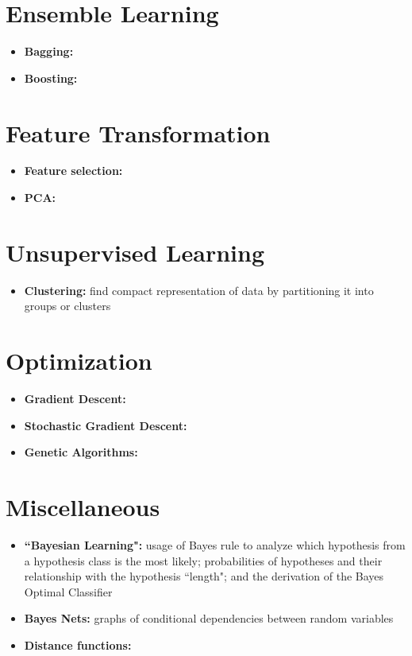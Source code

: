 \documentclass[12pt]{article}
\begin{document}
\section{Ensemble Learning}

\begin{itemize}
	\item \textbf{Bagging:}
	\item \textbf{Boosting:}
\end{itemize}

\section{Feature Transformation}

\begin{itemize}
	\item \textbf{Feature selection:}
	\item \textbf{PCA:}
\end{itemize}

\section{Unsupervised Learning}

\begin{itemize}
	\item \textbf{Clustering:} find compact representation of data by partitioning it into groups or clusters
\end{itemize}

\section{Optimization}

\begin{itemize}
	\item \textbf{Gradient Descent:}
	\item \textbf{Stochastic Gradient Descent:}
	\item \textbf{Genetic Algorithms:}
\end{itemize}

\section{Miscellaneous}

\begin{itemize}
	\item \textbf{``Bayesian Learning"\emph{}:} usage of Bayes rule to analyze which hypothesis from a hypothesis class is the most likely; probabilities of hypotheses and their relationship with the hypothesis ``length"; and the derivation of the Bayes Optimal Classifier
	\item \textbf{Bayes Nets:} graphs of conditional dependencies between random variables
	\item \textbf{Distance functions:}
\end{itemize}
\end{document}
